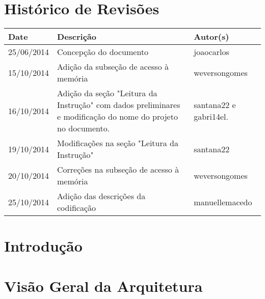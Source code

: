 \documentclass{report}
\begin{document}
\capa
%

\chapter*{Histórico de Revisões}
  \vspace*{1cm}
  \begin{table}[ht]
    \centering
    \begin{tabular}[pos]{|m{2cm} | m{8cm} | m{4cm}|} 
      \hline
      \cellcolor[gray]{0.9}
      \textbf{Date} & \cellcolor[gray]{0.9}\textbf{Descrição} & \cellcolor[gray]{0.9}\textbf{Autor(s)}\\
      \hline
      25/06/2014 & Concepção do documento & joaocarlos \\ \hline
      15/10/2014 & Adição da subseção de acesso à memória & weversongomes \\ \hline
      16/10/2014 & Adição da seção "Leitura da Instrução" com dados preliminares e modificação do nome do projeto no documento. & santana22 e gabri14el.\\ \hline
      19/10/2014 & Modificações na seção "Leitura da Instrução" & santana22 \\ \hline
      20/10/2014 & Correções na subseção de acesso à memória & weversongomes \\ \hline
      25/10/2014 & Adição das descrições da codificação & manuellemacedo \\ \hline
    \end{tabular}
  \end{table}

\tableofcontents

\chapter{Introdução}
  
	

\chapter{Visão Geral da Arquitetura}
\end{document}

